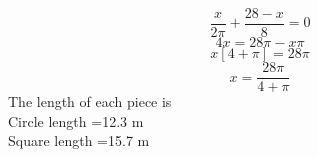 \documentclass[journal,12pt,twocolumn]{IEEEtran}
\begin{document}
	    \begin{equation}
\frac{x}{2\pi} + \frac{28-x}{8} = 0
	    \end{equation}
    \begin{equation}
        4x=28\pi-x\pi
    \end{equation}
    \begin{equation}
        x[4+\pi]=28\pi
    \end{equation}
    \begin{equation}
    x=\frac{28\pi}{4+\pi}
    \end{equation}
    The length of each piece is \\
       Circle length =12.3 m  \\
     Square length =15.7 m
\end{document}
